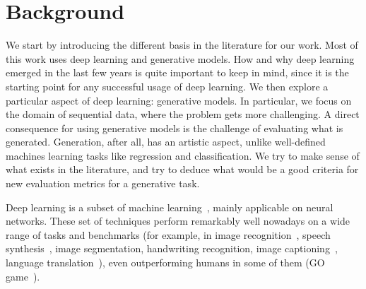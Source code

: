\clearpage

\section{Background}\label{sec:gbem_background}
\par We start by introducing the different basis in the literature for our work. Most of this work uses deep learning and generative models. How and why deep learning emerged in the last few years is quite important to keep in mind, since it is the starting point for any successful usage of deep learning. We then explore a particular aspect of deep learning: generative models. In particular, we focus on the domain of sequential data, where the problem gets more challenging. A direct consequence for using generative models is the challenge of evaluating what is generated. Generation, after all, has an artistic aspect, unlike well-defined machines learning tasks like regression and classification. We try to make sense of what exists in the literature, and try to deduce what would be a good criteria for new evaluation metrics for a generative task.

\par Deep learning is a subset of machine learning~\citep{lecun2015deep,Goodfellow-et-al-2016}, mainly applicable on neural networks. These set of techniques perform remarkably well nowadays on a wide range of tasks and benchmarks (for example, in image recognition~\citep{krizhevsky2012imagenet,simonyan2014very,he2016deep}, speech synthesis~\citep{oord2016wavenet}, image segmentation, handwriting recognition, image captioning~\citep{DBLP:journals/corr/VinyalsTBE14,karpathy2015deep}, language translation~\citep{sutskever2014sequence}), even outperforming humans in some of them (GO game~\citep{silver2016mastering}).


